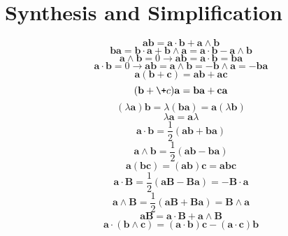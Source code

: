 \documentclass[11pt, a4paper, fleqn]{report}
\numberwithin{equation}{section}
\def\*#1{\mathbf{#1}}
\begin{document}
\section{Synthesis and Simplification}
\begin{equation}
    \*a\*b=\*a\cdot\*b+\*a\wedge\*b
\end{equation}
\begin{equation}
    \*b\*a=\*b\cdot\*a+\*b\wedge\*a=\*a\cdot\*b-\*a\wedge\*b
\end{equation}
\begin{equation}
    \*a\wedge\*b=0\rightarrow \*a\*b=\*a\cdot\*b=\*b\*a
\end{equation}
\begin{equation}
    \*a\cdot\*b=0\rightarrow \*a\*b=\*a\wedge\*b=-\*b\wedge\*a=-\*b\*a
\end{equation}
\begin{equation}
    \*a(\*b + \*c)=\*a\*b + \*a\*c
\end{equation}
\begin{equation}
    (\*b + \+c)\*a=\*b\*a + \*c\*a
\end{equation}
\begin{equation}
    (\lambda\*a)\*b=\lambda(\mathbf{b}\mathbf{a})=\mathbf{a}(\lambda\mathbf{b})
\end{equation}
\begin{equation}
    \lambda\mathbf{a}=\mathbf{a}\lambda
\end{equation}
\begin{equation}
    \mathbf{a}\cdot\mathbf{b}=\frac{1}{2}(\mathbf{a}\mathbf{b}+\mathbf{b}\mathbf{a})
\end{equation}
\begin{equation}
    \mathbf{a}\wedge\mathbf{b}=\frac{1}{2}(\mathbf{a}\mathbf{b}-\mathbf{b}\mathbf{a})
\end{equation}
\begin{equation}
    \mathbf{a}(\mathbf{b}\mathbf{c})=(\mathbf{a}\mathbf{b})\mathbf{c}=\mathbf{a}\mathbf{b}\mathbf{c}
\end{equation}
\begin{equation}
    \mathbf{a}\cdot\mathbf{B}=\frac{1}{2}(\mathbf{a}\mathbf{B}-\mathbf{B}\mathbf{a})=-\mathbf{B}\cdot\mathbf{a}
\end{equation}
\begin{equation}
    \mathbf{a}\wedge\mathbf{B}=\frac{1}{2}(\mathbf{a}\mathbf{B}+\mathbf{B}\mathbf{a})=\mathbf{B}\wedge\mathbf{a}
\end{equation}
\begin{equation}
    \mathbf{a}\mathbf{B}=\mathbf{a}\cdot\mathbf{B}+\mathbf{a}\wedge\mathbf{B}
\end{equation}
\begin{equation}
    \mathbf{a}\cdot(\mathbf{b}\wedge\mathbf{c})=(\mathbf{a}\cdot\mathbf{b})\mathbf{c}-(\mathbf{a}\cdot\mathbf{c})\mathbf{b}
\end{equation}
\end{document}
